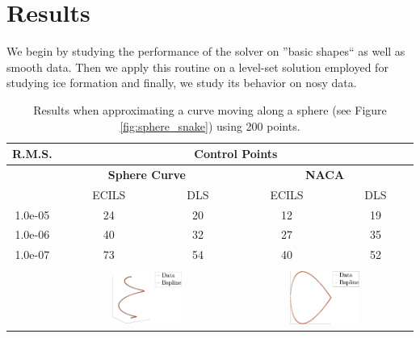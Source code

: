 \documentclass[a4paper,12pt]{article}
\begin{document}
   
\section{Results}
We begin by studying the performance of the solver on ''basic shapes`` as well as smooth data. 
Then we apply this routine on a level-set solution employed for studying ice formation and finally, we study 
 its behavior on nosy data. 
 

 \begin{table}
 \centering
  \begin{tabular}{||c||c c || c c ||}
  \hline
 R.M.S.  &\multicolumn{4}{c||}{Control Points}\\
 \hline
  &\multicolumn{2}{c||}{\textbf{Sphere Curve}} & \multicolumn{2}{c||}{\textbf{NACA}}\\

 & ECILS& DLS & ECILS & DLS\\
 \hline
1.0e-05 & 24	& 20 & 12 & 19\\
1.0e-06 & 40	& 32 & 27 & 35\\
1.0e-07 & 73	& 54 & 40 & 52 \\
\hline
&\multicolumn{2}{c||}{}&\multicolumn{2}{c||}{}\\
&\multicolumn{2}{c||}{\includegraphics[width=0.42\textwidth]{snake-crop}}
&\multicolumn{2}{c||}{\includegraphics[width=0.42\textwidth]{naca27-crop} }\\
\hline
\end{tabular}
\caption{Results when approximating a curve moving along a sphere (see Figure \ref{fig:sphere_snake}) using 200 points.}
 \end{table}
\end{document}

